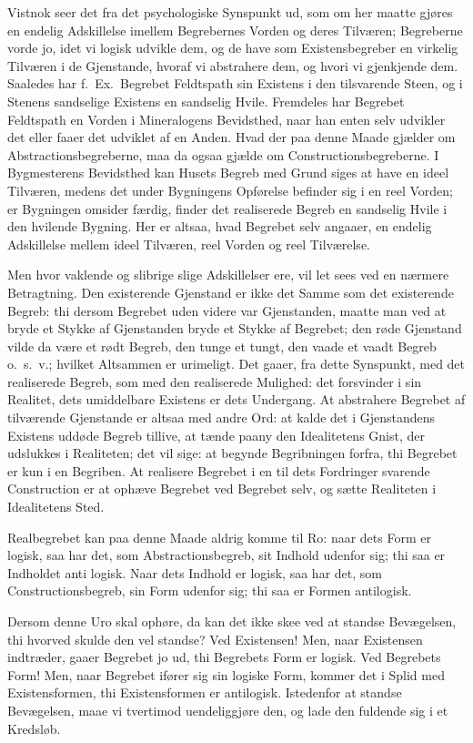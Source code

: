\documentclass[12pt]{book}
\newcommand{\opage}[1]{\marginnote{\footnotesize\textit{[#1]}}}
\begin{document}
Vistnok seer det fra det psychologiske Synspunkt ud, som om her maatte gjøres en endelig
Adskillelse imellem Begrebernes Vorden og deres Tilværen; Begreberne vorde jo, idet vi logisk
udvikle dem, og de have som Existensbegreber en virkelig Tilværen i de Gjenstande, hvoraf vi
abstrahere dem, og hvori vi gjenkjende dem. Saaledes har f.\ Ex.\ Begrebet Feldtspath
\opage{168} sin Existens i den tilsvarende Steen, og i Stenens sandselige Existens en sandselig Hvile.
Fremdeles har Begrebet Feldtspath en Vorden i Mineralogens Bevidsthed, naar han enten selv
udvikler det eller faaer det udviklet af en Anden. Hvad der paa denne Maade gjælder om
Abstractionsbegreberne, maa da ogsaa gjælde om Constructionsbegreberne. I Bygmesterens
Bevidsthed kan Husets Begreb med Grund siges at have en ideel Tilværen, medens det under
Bygningens Opførelse befinder sig i en reel Vorden; er Bygningen omsider færdig, finder det
realiserede Begreb en sandselig Hvile i den hvilende Bygning. Her er altsaa, hvad Begrebet selv
angaaer, en endelig Adskillelse mellem ideel Tilværen, reel Vorden og reel Tilværelse.

Men hvor vaklende og slibrige slige Adskillelser ere, vil let sees ved en nærmere Betragtning.
Den existerende Gjenstand er ikke det Samme som det existerende Begreb: thi dersom Begrebet uden
videre var Gjenstanden, maatte man ved at bryde et Stykke af Gjenstanden bryde et Stykke af
Begrebet; den røde Gjenstand vilde da være et rødt Begreb, den tunge et tungt, den vaade et
vaadt Begreb o.\ s.\ v.; hvilket Altsammen er urimeligt. Det gaaer, fra dette Synspunkt, med det
realiserede Begreb, som med den realiserede Mulighed: det forsvinder i sin Realitet, dets
umiddelbare Existens er dets Undergang. At abstrahere Begrebet af tilværende Gjenstande er
altsaa med andre Ord: at kalde det i Gjenstandens Existens uddøde Begreb tillive, at tænde paany
den Idealitetens Gnist, der udslukkes i Realiteten; det vil sige: at begynde Begribningen forfra,
thi Begrebet er kun i en Begriben. At realisere Begrebet i en til dets Fordringer svarende
Construction er at ophæve Begrebet ved Begrebet selv, og sætte Realiteten i Idealitetens Sted.

Realbegrebet kan paa denne Maade aldrig komme til Ro: naar dets Form er logisk, saa har det, som
Abstractionsbegreb, sit Indhold udenfor sig; thi saa er Indholdet anti%
\opage{169} logisk. Naar dets Indhold er logisk, saa har det, som Constructionsbegreb, sin Form udenfor sig;
thi saa er Formen antilogisk.

Dersom denne Uro skal ophøre, da kan det ikke skee ved at standse Bevægelsen, thi hvorved skulde
den vel standse? Ved Existensen! Men, naar Existensen indtræder, gaaer Begrebet jo ud, thi
Begrebets Form er logisk. Ved Begrebets Form! Men, naar Begrebet ifører sig sin logiske Form,
kommer det i Splid med Existensformen, thi Existensformen er antilogisk. Istedenfor at standse
Bevægelsen, maae vi tvertimod uendeliggjøre den, og lade den fuldende sig i et Kredsløb.
\end{document}
